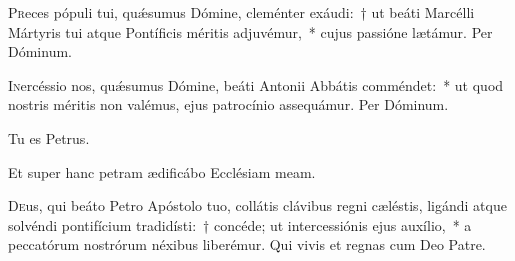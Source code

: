 \documentclass[vesperale_romanum.tex]{subfiles}
\begin{document}
\commsequentis

\myrule

\newpage
{}

\semiduplex


\oratio

\lettrine{P}{r}eces pópuli tui, quǽsumus Dómine, cleménter exáudi:~† ut beáti Marcélli Mártyris tui atque Pontíficis méritis adjuvémur,~* cujus passióne lætámur.
Per Dóminum.

\vespsequentiscomm

\myrule


\duplex

\oratio

\lettrine{I}{n}ercéssio nos, quǽsumus Dómine, beáti Antonii Abbátis comméndet:~* ut quod nostris méritis non valémus, ejus patrocínio assequámur.
Per Dóminum.



\myrule
\label{jan_18}
{}

\duplexmajus




\label{vv_tu_es_petrus}
 \vv Tu es Petrus.

\rr Et super hanc petram ædificábo Ecclésiam meam.


\oratio
\label{oratio_festo_cathedrae_s_petri}
\lettrine{D}{e}us, qui beáto Petro Apóstolo tuo, collátis clávibus regni cæléstis, ligándi atque solvéndi pontifícium tradidísti:~† concéde; ut intercessiónis ejus auxílio,~* a peccatórum nostrórum néxibus liberémur. Qui vivis et regnas cum Deo Patre.
\end{document}
